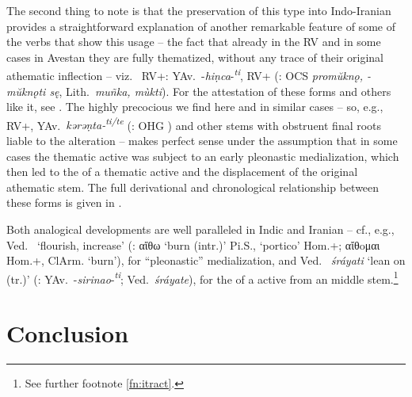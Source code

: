 \documentclass[output=paper,colorlinks,citecolor=brown]{langscibook}
\begin{document}
\largerpage
The second thing to note is that the preservation of this type into Indo-Iranian provides a straightforward explanation of another remarkable feature of some of the verbs that show this usage -- the fact that already in the RV and in some cases in Avestan they are fully thematized, without any trace of their original athematic inflection -- viz.\  RV+: YAv.\ -\textit{hiṇca}-\textit{\textsuperscript{ti}},   RV+ (: OCS \textit{promŭknǫ, -mŭknǫti sę}, Lith.\ \textit{muñka, mùkti}). For the attestation of these forms and others like it, see \citealt{Hill2007}. The highly precocious  we find here and in similar cases -- so, e.g.,  RV+, YAv.\ \textit{kərəṇta-\textsuperscript{ti/te}}  (: OHG \mbox{)} and other stems with obstruent final roots liable to the  alteration -- makes perfect sense under the assumption that in some cases the thematic  active was subject to an early pleonastic medialization, which then led to the  of a thematic  active and the displacement of the original athematic stem. The full derivational and chronological relationship between these forms is given in .



Both analogical developments are well paralleled in Indic and Iranian -- cf., e.g., Ved.\  ‘flourish, increase’ (: {αἴθω}  ‘burn (intr.)’ Pi.S.,  ‘portico’ Hom.+;  αἴθoμαι Hom.+, ClArm.  ‘burn’), for “pleonastic” medialization, and Ved.\  \textit{śráyati} ‘lean on (tr.)’ (:  YAv.\ -\textit{sirinao}-\textit{\textsuperscript{ti}}; Ved.\ \textit{śráyate}), for the  of a  active from an  middle stem.\footnote{See further footnote \ref{fn:itract}.}

\section{Conclusion}
\end{document}
